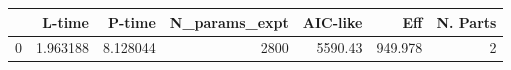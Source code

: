 \begin{tabular}{lrrrrrr}
\toprule
{} &    L-time &    P-time &  N\_params\_expt &  AIC-like &      Eff &  N. Parts \\
\midrule
0 &  1.963188 &  8.128044 &           2800 &   5590.43 &  949.978 &         2 \\
\bottomrule
\end{tabular}
